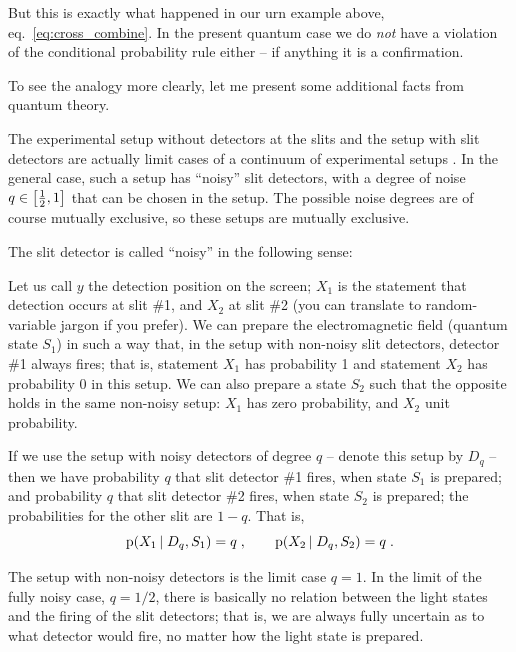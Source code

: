 \documentclass[\ifafour a4paper,12pt,\else a5paper,10pt,\fi%
onecolumn,oneside,article,%
british%
]{memoir}
\theoremstyle{remark}
\theoremstyle{innote}
\newcommand*{\citep}{\parencites}%
\DeclarePairedDelimiter\clcl{[}{]}
\newcommand*{\pf}{\mathrm{p}}%
\renewcommand*{\|}[1][]{\nonscript\,#1\vert\nonscript\;\mathopen{}}
\newcommand*{\eqn}{eq.}%
\newcommand*{\yxa}{X_{1}}
\newcommand*{\yxb}{X_{2}}
\newcommand*{\yDq}{D_{q}}
\begin{document}
But this is exactly what happened in our urn example above,
\eqn~\eqref{eq:cross_combine}. In the present quantum case we do \emph{not}
have a violation of the conditional probability rule either -- if anything
it is a confirmation.

To see the analogy more clearly, let me present some additional facts from
quantum theory.

\medskip

The experimental setup without detectors at the slits and the setup with
slit detectors are actually limit cases of a continuum of experimental
setups \citep{woottersetal1979}[for a recent review and further references
see][]{banaszeketal2013}. In the general case, such a setup has
\enquote{noisy} slit detectors, with a degree of noise
$q \in \clcl[\big]{\tfrac{1}{2}, 1}$ that can be chosen in the setup. The
possible noise degrees are of course mutually exclusive, so these setups
are mutually exclusive.

The slit detector is called \enquote{noisy} in the following sense:

Let us call $y$ the detection position on the screen; $\yxa$ is the
statement that detection occurs at slit \#1, and $\yxb$ at slit \#2 (you
can translate to random-variable jargon if you prefer). We can prepare the
electromagnetic field (quantum state $S_{1}$) in such a way that, in the
setup with non-noisy slit detectors, detector \#1 always fires; that is,
statement $\yxa$ has probability 1 and statement $\yxb$ has probability 0
in this setup. We can also prepare a state $S_{2}$ such that the opposite
holds in the same non-noisy setup: $\yxa$ has zero probability, and $\yxb$
unit probability.

If we use the setup with noisy detectors of degree $q$ -- denote this setup by
$\yDq$ -- then we have probability $q$ that slit detector \#1 fires, when
state $S_{1}$ is prepared; and probability $q$ that slit detector \#2
fires, when state $S_{2}$ is prepared; the probabilities for the other slit
are $1-q$. That is,
\begin{equation}
  \label{eq:explain_noisy}
  \pf(\yxa \| \yDq, S_{1}) = q \;,
  \qquad
  \pf(\yxb \| \yDq, S_{2}) = q \;.
\end{equation}

The setup with non-noisy detectors is the limit case $q=1$. In the limit of
the fully noisy case, $q=1/2$, there is basically no relation between the
light states and the firing of the slit detectors; that is, we are always
fully uncertain as to what detector would fire, no matter how the light
state is prepared.
  
\end{document}
